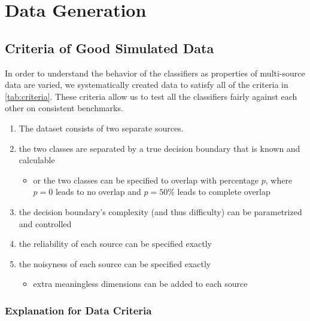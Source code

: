 \documentclass{article}
\begin{document}
\section{Data Generation}

\subsection{Criteria of Good Simulated Data}

In order to understand the behavior of the classifiers as properties of
multi-source data are varied, we systematically created data to satisfy all of
the criteria in \ref{tab:criteria}.  These criteria allow us to test all the
classifiers fairly against each other on consistent benchmarks.

\begin{minipage}{\textwidth}
\centering
\begin{enumerate}
    \item The dataset consists of two separate sources.
    \item \label{itm:separable} the two classes are separated by a true
        decision boundary that is known and calculable
    \begin{itemize}
        \item or the two classes can be specified to overlap with percentage
            $p$, where $p=0$ leads to no overlap and $p=50$\% leads to complete
            overlap
    \end{itemize}
    \item the decision boundary's complexity (and thus difficulty) can be
        parametrized and controlled
    \item the reliability of each source can be specified exactly
    \item the noisyness of each source can be specified exactly
    \begin{itemize}
        \item \label{itm:noise_dims} extra meaningless dimensions can be
            added to each source
    \end{itemize}
\end{enumerate}
\label{tab:criteria}
\end{minipage}

\subsubsection{Explanation for Data Criteria}
\end{document}
